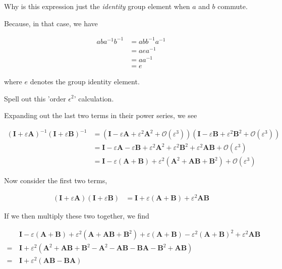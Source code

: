 \documentclass[../the-road-to-reality.tex]{subfiles}
\begin{document}
\begin{questions}
\question Why is this expression just the \textit{identity} group element when $a$ and $b$ commute.

\begin{solution}
        Because, in that case, we have

        \begin{align*}
				aba^{-1}b^{-1} &= abb^{-1}a^{-1} \\
                &= aea^{-1} \\
                &= aa^{-1} \\
                &= e
        \end{align*}

        where $e$ denotes the group identity element.
\end{solution}

\question Spell out this 'order $\epsilon^2$' calculation.

\begin{solution}
        Expanding out the last two terms in their power series, we see

        \begin{align*}
                (\mathbf{I} + \varepsilon\mathbf{A})^{-1}(\mathbf{I} + \varepsilon\mathbf{B})^{-1} &= (\mathbf{I} - \varepsilon\mathbf{A} + \varepsilon^2\mathbf{A}^2 + \mathcal{O}(\varepsilon^3))(\mathbf{I} - \varepsilon\mathbf{B} + \varepsilon^2\mathbf{B}^2 + \mathcal{O}(\varepsilon^3)) \\
                &= \mathbf{I} - \varepsilon\mathbf{A} - \varepsilon\mathbf{B} + \varepsilon^2\mathbf{A}^2 + \varepsilon^2\mathbf{B}^2 + \varepsilon^2\mathbf{AB} +  \mathcal{O}(\varepsilon^3) \\
                &= \mathbf{I} - \varepsilon(\mathbf{A} + \mathbf{B}) + \varepsilon^2(\mathbf{A}^2 + \mathbf{AB} + \mathbf{B}^2) + \mathcal{O}(\varepsilon^3) 
        \end{align*}

        Now consider the first two terms,

        \begin{align*}
                (\mathbf{I} + \varepsilon\mathbf{A})(\mathbf{I} + \varepsilon\mathbf{B}) &= \mathbf{I} + \varepsilon(\mathbf{A} + \mathbf{B}) + \varepsilon^2\mathbf{AB} 
        \end{align*}

        If we then multiply these two together, we find

        \begin{align*}
                &\mathbf{I} - \varepsilon(\mathbf{A} + \mathbf{B}) + \varepsilon^2(\mathbf{A} + \mathbf{AB} + \mathbf{B}^2) +\varepsilon(\mathbf{A} + \mathbf{B}) - \varepsilon^2(\mathbf{A} + \mathbf{B})^2 + \varepsilon^2\mathbf{AB} \\
                =\,&\mathbf{I} + \varepsilon^2(\mathbf{A}^2 + \mathbf{AB} + \mathbf{B}^2 - \mathbf{A}^2 - \mathbf{AB} - \mathbf{BA} - \mathbf{B}^2 + \mathbf{AB}) \\
                =\,&\mathbf{I} + \varepsilon^2(\mathbf{AB} - \mathbf{BA})
        \end{align*}
\end{solution}


\end{questions}
\end{document}
